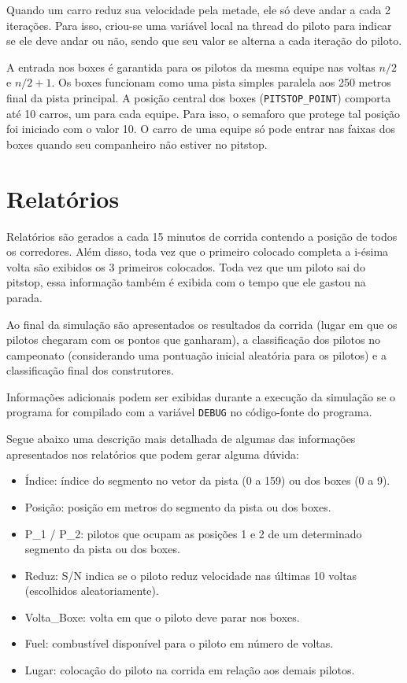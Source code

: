 \documentclass[12pt]{article}
\begin{document}
Quando um carro reduz sua velocidade pela metade, ele só deve andar a cada 2 iterações. 
Para isso, criou-se uma variável local na thread do piloto para indicar se ele deve andar ou 
não, sendo que seu valor se alterna a cada iteração do piloto.

A entrada nos boxes é garantida para os pilotos da mesma equipe nas voltas $n/2$ e $n/2 + 1$. 
Os boxes funcionam como uma pista simples paralela aos 250 metros final da pista principal. 
A posição central dos boxes (\verb|PITSTOP_POINT|) comporta até 10 carros, um para cada equipe. 
Para isso, o semaforo que protege tal posição foi iniciado com o valor 10. O carro de uma 
equipe só pode entrar nas faixas dos boxes quando seu companheiro não estiver no pitstop.


\section{Relatórios}

Relatórios são gerados a cada 15 minutos de corrida contendo a posição de todos os 
corredores. Além disso, toda vez que o primeiro colocado completa a i-ésima volta são
exibidos os 3 primeiros colocados. Toda vez que um piloto sai do pitstop, essa informação 
também é exibida com o tempo que ele gastou na parada.

Ao final da simulação são apresentados os resultados da corrida (lugar em que os pilotos 
chegaram com os pontos que ganharam), a classificação dos pilotos no campeonato (considerando 
uma pontuação inicial aleatória para os pilotos) e a classificação final dos construtores.

Informações adicionais podem ser exibidas durante a execução da simulação se o programa
for compilado com a variável \verb|DEBUG| no código-fonte do programa. 

Segue abaixo uma descrição mais detalhada de algumas das informações apresentados nos 
relatórios que podem gerar alguma dúvida: 
%
\begin{itemize}
\item Índice: índice do segmento no vetor da pista (0 a 159) ou dos boxes (0 a 9).
\item Posição: posição em metros do segmento da pista ou dos boxes. 
\item P\_1 / P\_2: pilotos que ocupam as posições 1 e 2 de um determinado segmento da pista 
ou dos boxes.
\item Reduz: S/N indica se o piloto reduz velocidade nas últimas 10 voltas (escolhidos 
aleatoriamente).      
\item Volta\_Boxe: volta em que o piloto deve parar nos boxes.
\item Fuel: combustível disponível para o piloto em número de voltas.
\item Lugar: colocação do piloto na corrida em relação aos demais pilotos.
\end{itemize}
\end{document}
